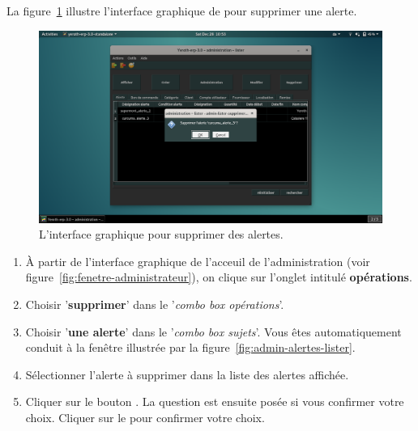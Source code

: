 
\newpage
{}

La figure~\ref{fig:admin-alertes-supprimer} illustre l'interface
graphique de \yeren pour supprimer une alerte.\\

\begin{figure}[!htpb]
	\centering
	\includegraphics[scale=0.35]{images/alerte-supprimer.png}
	\caption{L'interface graphique pour supprimer des alertes.}
	\label{fig:admin-alertes-supprimer}
\end{figure}

\begin{enumerate}[1)]
	\item \`A partir de l'interface graphique de l'acceuil de
		l'administration (voir figure~\ref{fig:fenetre-administrateur}),
		on clique sur l'onglet intitul\'e \textbf{op\'erations}. 
		
	\item Choisir '\textbf{supprimer}' dans le '\emph{combo box
		op\'erations}'.
		
	\item Choisir '\textbf{une alerte}' dans le '\emph{combo box
		sujets}'. Vous \^etes automatiquement conduit \`a la fen\^etre
		illustr\'ee par la figure~\ref{fig:admin-alertes-lister}.
		
	\item S\'electionner l'alerte \`a supprimer dans la liste
		des alertes affich\'ee.
		
	\item Cliquer sur le bouton . La question
		est ensuite pos\'ee si vous confirmer votre choix.
		Cliquer sur le  pour confirmer votre choix.
\end{enumerate}
